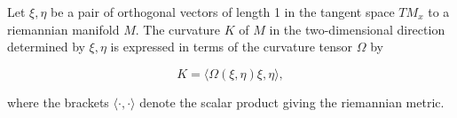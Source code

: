 Let $\xi, \eta$ be a pair of orthogonal vectors of length 1 in the tangent space $TM_x$ to a riemannian manifold $M$. The curvature $K$ of $M$ in the two-dimensional direction determined by $\xi, \eta$ is expressed in terms of the curvature tensor $\Omega$ by

$$K = \langle \Omega(\xi, \eta)\xi, \eta \rangle,$$

where the brackets $\langle \cdot, \cdot \rangle$ denote the scalar product giving the riemannian metric.

